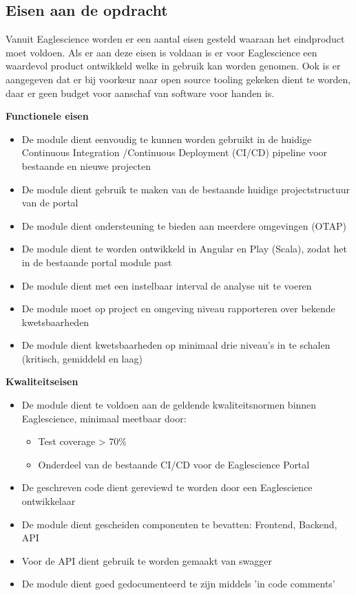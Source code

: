 \subsection{Eisen aan de opdracht}\label{subsec: eisen-aan-de-opdracht}
Vanuit Eaglescience worden er een aantal eisen gesteld waaraan het eindproduct moet voldoen. Als er aan deze eisen is voldaan is er voor Eaglescience een waardevol product ontwikkeld welke in gebruik kan worden genomen. Ook is er aangegeven dat er bij voorkeur naar open source tooling  gekeken dient te worden, daar er geen budget voor aanschaf van software voor handen is.
\newpage

\textbf{Functionele eisen}
\begin{itemize}
\item De module dient eenvoudig te kunnen worden gebruikt in de huidige Continuous Integration /Continuous Deployment (CI/CD) pipeline voor bestaande en nieuwe projecten
\item De module dient gebruik te maken van de bestaande huidige projectstructuur van de portal
\item De module dient ondersteuning te bieden aan meerdere omgevingen (OTAP)
\item De module dient te worden ontwikkeld in Angular en Play (Scala), zodat het in de bestaande portal module past
\item De module dient met een instelbaar interval de analyse uit te voeren
\item De module moet op project en omgeving niveau rapporteren over bekende kwetsbaarheden
\item De module dient kwetsbaarheden op minimaal drie niveau’s in te schalen (kritisch, gemiddeld en laag)
\end{itemize}
\textbf{Kwaliteitseisen}
\begin{itemize}
\item De module dient te voldoen aan de geldende kwaliteitsnormen binnen Eaglescience, minimaal meetbaar door:
	\begin{itemize}
	\item Test coverage > 70\%
	\item Onderdeel van de bestaande CI/CD voor de Eaglescience Portal
	\end{itemize}
\item De geschreven code dient gereviewd te worden door een Eaglescience ontwikkelaar
\item De module dient gescheiden componenten te bevatten: Frontend, Backend, API
\item Voor de API dient gebruik te worden gemaakt van swagger
\item De module dient goed gedocumenteerd te zijn middels 'in code comments'
\end{itemize}

